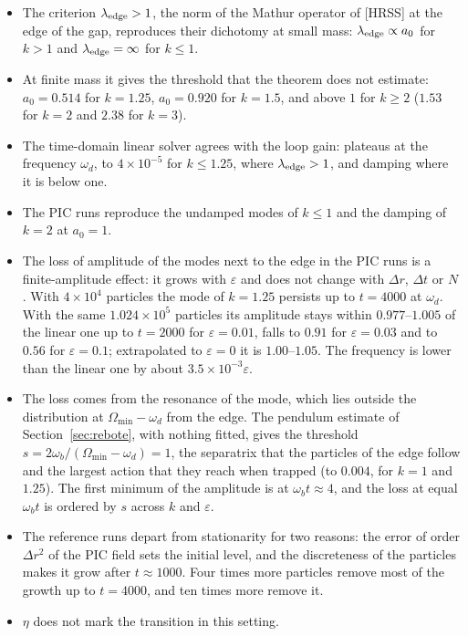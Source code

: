 \documentclass[11pt,a4paper]{article}
\begin{document}
\begin{itemize}
\item The criterion $\lambda_{\rm edge}>1$, the norm of the Mathur operator of [HRSS] at the edge
of the gap, reproduces their dichotomy at small mass: $\lambda_{\rm edge}\propto a_0$ for $k>1$
and $\lambda_{\rm edge}=\infty$ for $k\le1$.
\item At finite mass it gives the threshold that the theorem does not estimate:
$a_0=0.514$ for $k=1.25$, $a_0=0.920$ for $k=1.5$, and above $1$ for $k\ge2$ ($1.53$ for
$k=2$ and $2.38$ for $k=3$).
\item The time-domain linear solver agrees with the loop gain: plateaus at the frequency
$\omega_d$, to $4\times10^{-5}$ for $k\le1.25$, where $\lambda_{\rm edge}>1$, and damping where it is below
one.
\item The PIC runs reproduce the undamped modes of $k\le1$ and the damping of $k=2$ at $a_0=1$.
\item The loss of amplitude of the modes next to the edge in the PIC runs is a finite-amplitude
effect: it grows with $\varepsilon$ and does not change with $\Delta r$, $\Delta t$ or $N$. With
$4\times10^4$ particles the mode of $k=1.25$ persists up to $t=4000$ at $\omega_d$. With the same
$1.024\times10^5$ particles its amplitude stays within $0.977$--$1.005$ of the linear one up to
$t=2000$ for $\varepsilon=0.01$, falls to $0.91$ for $\varepsilon=0.03$ and to $0.56$ for
$\varepsilon=0.1$; extrapolated to $\varepsilon=0$ it is $1.00$--$1.05$. The frequency is lower than
the linear one by about $3.5\times10^{-3}\varepsilon$.
\item The loss comes from the resonance of the mode, which lies outside the distribution at
$\Omega_{\min}-\omega_d$ from the edge. The pendulum estimate of Section~\ref{sec:rebote}, with
nothing fitted, gives the threshold $s=2\omega_b/(\Omega_{\min}-\omega_d)=1$, the separatrix that the
particles of the edge follow and the largest action that they reach when trapped (to $0.004$,
for $k=1$ and $1.25$). The first minimum of the amplitude is at $\omega_bt\approx4$, and the loss
at equal $\omega_bt$ is ordered by $s$ across $k$ and $\varepsilon$.
\item The reference runs depart from stationarity for two reasons: the error of order $\Delta r^2$
of the PIC field sets the initial level, and the discreteness of the particles makes it grow
after $t\approx1000$. Four times more particles remove most of the growth up to $t=4000$, and
ten times more remove it.
\item $\eta$ does not mark the transition in this setting.
\end{itemize}
\end{document}
